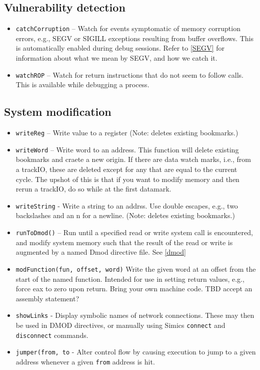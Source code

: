 \documentclass[titlepage]{article}
\begin{document}
\subsection{Vulnerability detection}
\begin{itemize}
\item {\tt catchCorruption} – Watch for events symptomatic of memory corruption errors, e.g., SEGV or SIGILL exceptions resulting from buffer overflows.  This is automatically enabled during debug sessions. Refer to \ref{SEGV} for information about what we mean by SEGV, and how we catch it.

\item {\tt watchROP} -- Watch for return instructions that do not seem to follow calls.  This is available while debugging a process.
\end{itemize}

\subsection{System modification}
\begin{itemize}

\item {\tt writeReg} – Write value to a register (Note: deletes existing bookmarks.)
\item {\tt writeWord} – Write word to an address. This function will delete existing bookmarks and craete a new origin.  If there are data watch marks,
i.e., from a trackIO, these are deleted except for any that are equal to the current cycle.  The upshot of this is that if you want to modify memory
and then rerun a trackIO, do so while at the first datamark.
\item {\tt writeString} - Write a string to an addrss. Use double escapes, e.g., two backslashes and an n for a newline. (Note: deletes existing bookmarks.)

\item {\tt runToDmod()} – Run until a specified read or write system call is encountered, and modify system memory such
that the result of the read or write is augmented by a named Dmod directive file.  See \ref{dmod}

\item {\tt modFunction(fun, offset, word)} Write the given word at an offset from the start of the named function.  Intended for use in setting return
values, e.g., force eax to zero upon return.  Bring your own machine code.  TBD accept an assembly statement?

\item {\tt showLinks} - Display symbolic names of network connections.  These may then be used in DMOD directives, or manually using Simics {\tt connect}
and {\tt disconnect} commands.

\item {\tt jumper(from, to} - Alter control flow by causing execution to jump to a given address whenever a given {\tt from} address is hit.

\end{itemize}
\end{document}
